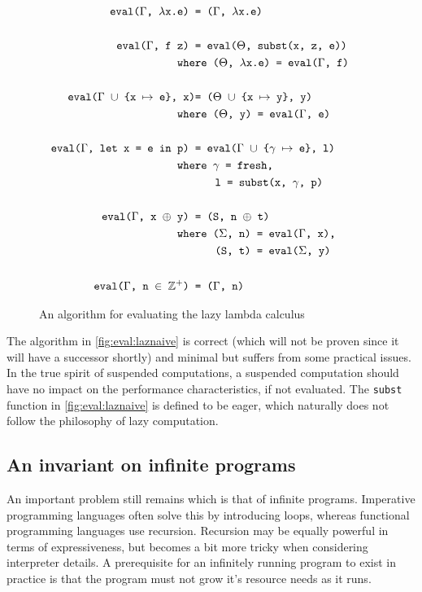 \begin{figure}
\begin{mdframed}[style=style1]
\begin{align}
  \texttt{eval($\Gamma$, $\lambda$x.e) }&\texttt{= ($\Gamma$, $\lambda$x.e)}\tag*{}\\\tag*{}\\
  \texttt{eval($\Gamma$, f z) }&\texttt{= eval($\Theta$, subst(x, z, e))}\tag*{}\\
  \texttt{whe}&\texttt{re ($\Theta$, $\lambda$x.e) = eval($\Gamma$, f)}\tag*{}\\\tag*{}\\
  \texttt{eval($\Gamma$ $\cup$ \{x $\mapsto$ e\}, x)}&\texttt{= ($\Theta$ $\cup$ \{x $\mapsto$ y\}, y)}\tag*{}\\
  \texttt{whe}&\texttt{re ($\Theta$, y) = eval($\Gamma$, e)}\tag*{}\\\tag*{}\\
  \texttt{eval($\Gamma$, let x = e in p) }&\texttt{= eval($\Gamma$ $\cup$ \{$\gamma$ $\mapsto$ e\}, l)}\tag*{}\\
  \texttt{whe}&\texttt{re $\gamma$ = fresh,}\tag*{}\\
  &\hspace{0.62cm}\texttt{l = subst(x, $\gamma$, p)}\tag*{}\\\tag*{}\\
  \texttt{eval($\Gamma$, x $\oplus$ y) }&\texttt{= (S, n $\oplus$ t)}\tag*{}\\
  \texttt{whe}&\texttt{re ($\Sigma$, n) = eval($\Gamma$, x),}\tag*{}\\
  &\hspace{0.62cm}\texttt{(S, t) = eval($\Sigma$, y)}\tag*{}\\\tag*{}\\
  \texttt{eval($\Gamma$, n $\in$ $\mathbb{Z^+}$) }&\texttt{= ($\Gamma$, n)}\tag*{}
\end{align}
\end{mdframed}
  \caption{An algorithm for evaluating the lazy lambda calculus}
  \label{fig:eval:laznaive}
\end{figure}
The algorithm in \autoref{fig:eval:laznaive} is correct (which will not be proven since it will have a successor shortly) and minimal but suffers from some practical issues.
In the true spirit of suspended computations, a suspended computation should have no impact on the performance characteristics, if not evaluated.
The \texttt{subst} function in \autoref{fig:eval:laznaive} is defined to be eager, which naturally does not follow the philosophy of lazy computation. 


\subsection{An invariant on infinite programs}\label{subsec:inf}
An important problem still remains which is that of infinite programs.
Imperative programming languages often solve this by introducing loops, whereas functional programming languages use recursion.
Recursion may be equally powerful in terms of expressiveness, but becomes a bit more tricky when considering interpreter details.
A prerequisite for an infinitely running program to exist in practice is that the program must not grow it's resource needs as it runs.

